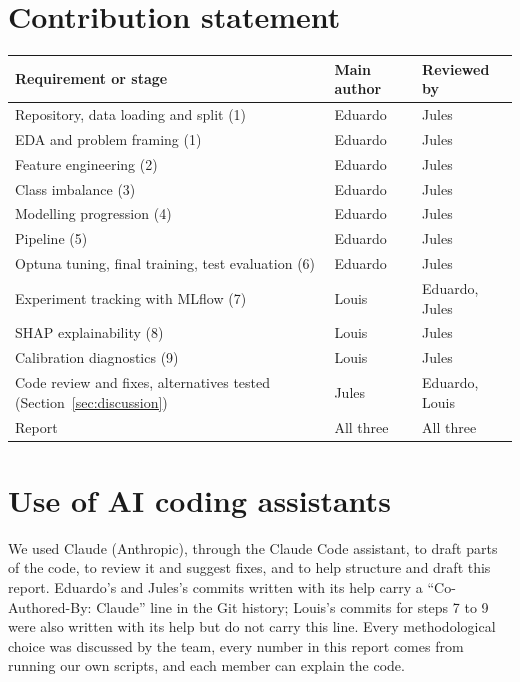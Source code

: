 \section*{Contribution statement}

\begin{table}[H]
\centering
\begin{tabular}{lll}
\toprule
Requirement or stage & Main author & Reviewed by \\
\midrule
Repository, data loading and split (1) & Eduardo & Jules \\
EDA and problem framing (1) & Eduardo & Jules \\
Feature engineering (2) & Eduardo & Jules \\
Class imbalance (3) & Eduardo & Jules \\
Modelling progression (4) & Eduardo & Jules \\
Pipeline (5) & Eduardo & Jules \\
Optuna tuning, final training, test evaluation (6) & Eduardo & Jules \\
Experiment tracking with MLflow (7) & Louis & Eduardo, Jules \\
SHAP explainability (8) & Louis & Jules \\
Calibration diagnostics (9) & Louis & Jules \\
Code review and fixes, alternatives tested (Section~\ref{sec:discussion}) & Jules & Eduardo, Louis \\
Report & All three & All three \\
\bottomrule
\end{tabular}
\end{table}

\section*{Use of AI coding assistants}

We used Claude (Anthropic), through the Claude Code assistant, to draft parts
of the code, to review it and suggest fixes, and to help structure and draft
this report. Eduardo's and Jules's commits written with its help carry a
``Co-Authored-By: Claude'' line in the Git history; Louis's commits for
steps 7 to 9 were also written with its help but do not carry this line.
Every methodological choice was discussed by the team, every number in this
report comes from running our own scripts, and each member can explain the
code.
